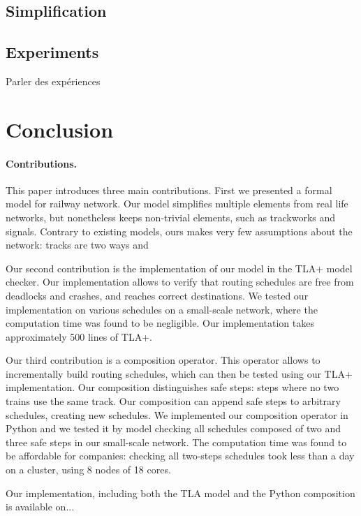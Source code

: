 \documentclass[runningheads]{llncs}
\begin{document}
\subsection{Simplification}

\subsection{Experiments} 
Parler des expériences

\section{Conclusion}
\label{sec:conclusion}

\paragraph{Contributions.}
This paper introduces three main contributions. First we presented a formal model for railway network. Our model simplifies multiple elements from real life networks, but nonetheless keeps non-trivial elements, such as trackworks and signals. Contrary to existing models, ours makes very few assumptions about the network: tracks are two ways and %

Our second contribution is the implementation of our model in the TLA+ model checker. Our implementation allows to verify that routing schedules are free from deadlocks and crashes, and reaches correct destinations. We tested our implementation on various schedules on a small-scale network, where the computation time was found to be negligible. Our implementation takes approximately 500 lines of TLA+.

Our third contribution is a composition operator. This operator allows to incrementally build routing schedules, which can then be tested using our TLA+ implementation. Our composition distinguishes safe steps: steps where no two trains use the same track. Our composition can append safe steps to arbitrary schedules, creating new schedules. We implemented our composition operator in Python and we tested it by model checking all schedules composed of two and three safe steps in our small-scale network. The computation time was found to be affordable for companies: checking all two-steps schedules took less than a day on a cluster, using 8 nodes of 18 cores.

Our implementation, including both the TLA model and the Python composition is available on...%
\end{document}
